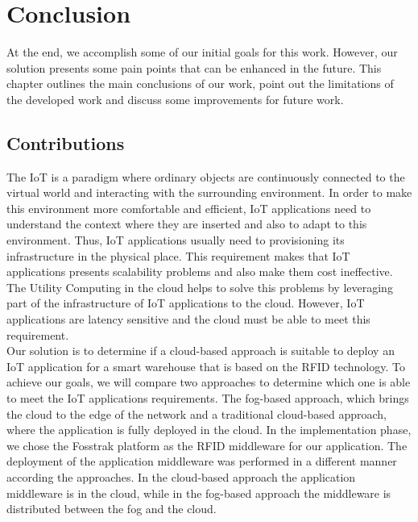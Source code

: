 
\chapter{Conclusion}
\label{chapter:conclusion}
At the end, we accomplish some of our initial goals for this work. However, our solution presents some
pain points that can be enhanced in the future. This chapter outlines the main conclusions of our work,
point out the limitations of the developed work and discuss some improvements for future work.

\section{Contributions}
\label{sec:contributions}
The \acrfull{IoT} is a paradigm where ordinary objects are continuously connected to the virtual
world and interacting with the surrounding environment. In order to make this environment more comfortable and
efficient, \gls{IoT} applications need to understand the context where they are inserted and also to
adapt to this environment. Thus, \gls{IoT} applications usually need to provisioning its infrastructure
in the physical place. This requirement makes that \gls{IoT} applications presents scalability
problems and also make them cost ineffective. The Utility Computing in the cloud helps to solve this
problems by leveraging part of the infrastructure of \gls{IoT} applications to the cloud. However,
\gls{IoT} applications are latency sensitive and the cloud must be able to meet this requirement.\\

Our solution is to determine if a cloud-based approach is suitable to deploy an \gls{IoT} application
for a smart warehouse that is based on the \gls{RFID} technology. To achieve our goals, we will
compare two approaches to determine which one is able to meet the \gls{IoT} applications requirements.
The fog-based approach, which brings the cloud to the edge of the network and a traditional cloud-based
approach, where the application is fully deployed in the cloud. In the implementation phase, we chose
the Fosstrak platform as the \gls{RFID} middleware for our application. The deployment of the
application middleware was performed in a different manner according the approaches. In the cloud-based
approach the application middleware is in the cloud, while in the fog-based approach the middleware
is distributed between the fog and the cloud.\\

